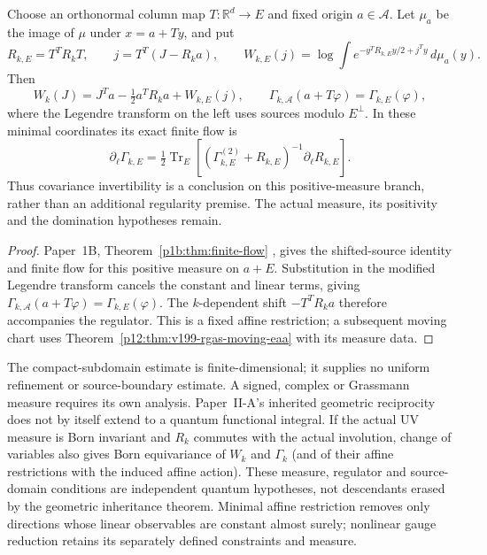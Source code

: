\documentclass[12pt,a4paper]{article}
\begin{document}
\begin{corollary}
\label{p12:cor:m8td-affine-eaa}
Choose an orthonormal column map $T:\mathbb R^d\to E$ and fixed origin
$a\in\mathcal A$. Let $\mu_a$ be the image of $\mu$ under $x=a+Ty$,
and put
\[
 R_{k,E}=T^TR_kT,\qquad j=T^T(J-R_ka),\qquad
 W_{k,E}(j)=\log\int e^{-y^TR_{k,E}y/2+j^Ty}\,d\mu_a(y).
\]
Then
\begin{equation}
 W_k(J)=J^Ta-\tfrac12a^TR_ka+W_{k,E}(j),\qquad
 \Gamma_{k,\mathcal A}(a+T\varphi)=\Gamma_{k,E}(\varphi),
 \label{p12:eq:m8td-affine-transport}
\end{equation}
where the Legendre transform on the left uses sources modulo $E^\perp$.
In these minimal coordinates its exact finite flow is
\[
 \partial_\ell\Gamma_{k,E}
 =\tfrac12\operatorname{Tr}_E
  [ (\Gamma_{k,E}^{(2)}+R_{k,E})^{-1}\partial_\ell R_{k,E}].
\]
Thus covariance invertibility is a conclusion on this positive-measure
branch, rather than an additional regularity premise. The actual measure,
its positivity and the domination hypotheses remain.
\end{corollary}
\begin{proof}
Paper~1B, Theorem~\ref{p1b:thm:finite-flow}
\cite{Kugelmann2026Paper1B}, gives the shifted-source identity and
finite flow for this positive measure on $a+E$. Substitution in the
modified Legendre transform cancels the constant and linear terms,
giving $\Gamma_{k,\mathcal A}(a+T\varphi)=\Gamma_{k,E}(\varphi)$.
The $k$-dependent shift $-T^TR_ka$ therefore accompanies the regulator.
This is a fixed affine restriction; a subsequent moving chart uses
Theorem~\ref{p12:thm:v199-rgas-moving-eaa} with its measure data.
\end{proof}
The compact-subdomain estimate is finite-dimensional; it supplies no
uniform refinement or source-boundary estimate. A signed, complex or
Grassmann measure requires its own analysis. Paper~II-A's inherited geometric reciprocity does not by itself extend to a
quantum functional integral.  If the actual UV measure is Born invariant and
$R_k$ commutes with the actual involution, change of variables also gives Born
equivariance of $W_k$ and $\Gamma_k$ (and of their affine restrictions with
the induced affine action).  These measure, regulator and source-domain
conditions are independent quantum hypotheses, not descendants erased by the
geometric inheritance theorem.
Minimal affine restriction removes only directions whose linear
observables are constant almost surely; nonlinear gauge reduction retains
its separately defined constraints and measure.
\end{document}
